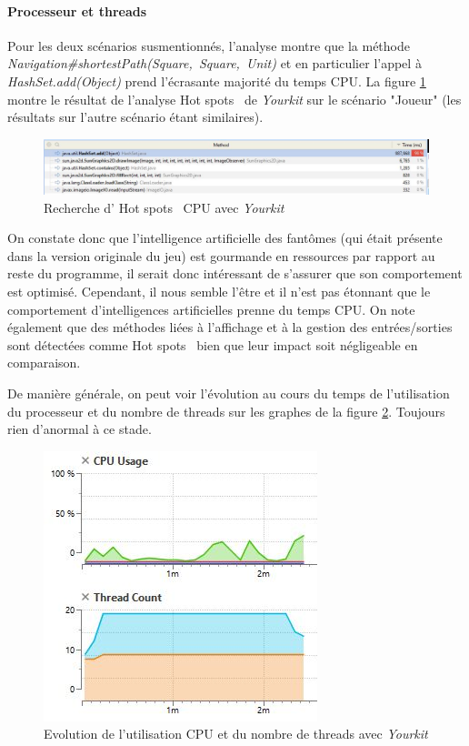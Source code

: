 \documentclass[12pt, openany]{report}
\begin{document}
\paragraph{Processeur et threads}
Pour les deux scénarios susmentionnés, l'analyse montre que la méthode \mbox{\textit{Navigation\#shortestPath(Square, Square, Unit)}} et en particulier l'appel à \mbox{\textit{HashSet.add(Object)}} prend l'écrasante majorité du temps CPU. La figure \ref{hotspot} montre le résultat de l'analyse \og Hot spots \fg \, de \textit{Yourkit} sur le scénario "Joueur" (les résultats sur l'autre scénario étant similaires).
\begin{figure}[h]
	\centering
	\includegraphics[width=16cm]{Images/hotspot.JPG}
	\caption{\label{hotspot} Recherche d' \og Hot spots \fg \, CPU avec \textit{Yourkit}}
\end{figure}

On constate donc que l'intelligence artificielle des fantômes (qui était présente dans la version originale du jeu) est gourmande en ressources par rapport au reste du programme, il serait donc intéressant de s'assurer que son comportement est optimisé. Cependant, il nous semble l'être et il n'est pas étonnant que le comportement d'intelligences artificielles prenne du temps CPU. On note également que des méthodes liées à l'affichage et à la gestion des entrées/sorties sont détectées comme \og Hot spots \fg \, bien que leur impact soit négligeable en comparaison.

De manière générale, on peut voir l'évolution au cours du temps de l'utilisation du processeur et du nombre de threads sur les graphes de la figure \ref{cpu-threads}. Toujours rien d'anormal à ce stade.
\begin{figure}[h]
	\centering
	\includegraphics{Images/cpu-threads.JPG}
	\caption{\label{cpu-threads} Evolution de l'utilisation CPU et du nombre de threads avec \textit{Yourkit}}
\end{figure}
\end{document}

